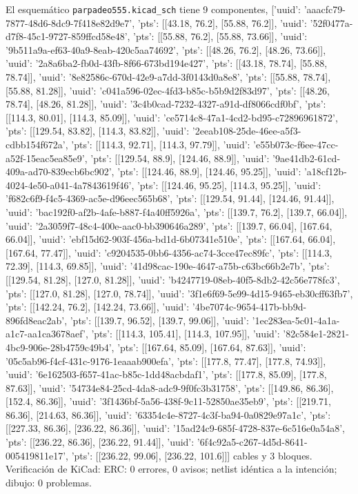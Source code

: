 \documentclass[a4paper,11pt]{article}
\begin{document}
El esquemático \texttt{parpadeo555.kicad\_sch} tiene 9 componentes, [{'uuid': 'aaacfc79-7877-48d6-8dc9-7f418e82d9e7', 'pts': [[43.18, 76.2], [55.88, 76.2]]}, {'uuid': '52f0477a-d7f8-45c1-9727-859ffcd58e48', 'pts': [[55.88, 76.2], [55.88, 73.66]]}, {'uuid': '9b511a9a-ef63-40a9-8eab-420c5aa74692', 'pts': [[48.26, 76.2], [48.26, 73.66]]}, {'uuid': '2a8a6ba2-fb0d-43fb-8f66-673bd194e427', 'pts': [[43.18, 78.74], [55.88, 78.74]]}, {'uuid': '8e82586c-670d-42e9-a7dd-3f0143d0a8e8', 'pts': [[55.88, 78.74], [55.88, 81.28]]}, {'uuid': 'c041a596-02ec-4fd3-b85c-b5b9d2f83d97', 'pts': [[48.26, 78.74], [48.26, 81.28]]}, {'uuid': '3c4b0cad-7232-4327-a91d-df8066cdf0bf', 'pts': [[114.3, 80.01], [114.3, 85.09]]}, {'uuid': 'ce5714c8-47a1-4cd2-bd95-c72896961872', 'pts': [[129.54, 83.82], [114.3, 83.82]]}, {'uuid': '2eeab108-25de-46ee-a5f3-cdbb154f672a', 'pts': [[114.3, 92.71], [114.3, 97.79]]}, {'uuid': 'e55b073c-f6ee-47cc-a52f-15eac5ea85e9', 'pts': [[129.54, 88.9], [124.46, 88.9]]}, {'uuid': '9ae41db2-61cd-409a-ad70-839ecb6bc902', 'pts': [[124.46, 88.9], [124.46, 95.25]]}, {'uuid': 'a18cf12b-4024-4e50-a041-4a7843619f46', 'pts': [[124.46, 95.25], [114.3, 95.25]]}, {'uuid': 'f682c6f9-f4c5-4369-ac5e-d96eec565b68', 'pts': [[129.54, 91.44], [124.46, 91.44]]}, {'uuid': 'bac192f0-af2b-4afe-b887-f4a40ff5926a', 'pts': [[139.7, 76.2], [139.7, 66.04]]}, {'uuid': '2a3059f7-48c4-400e-aac0-bb390646a289', 'pts': [[139.7, 66.04], [167.64, 66.04]]}, {'uuid': 'ebf15d62-903f-456a-bd1d-6b07341e510e', 'pts': [[167.64, 66.04], [167.64, 77.47]]}, {'uuid': 'c9204535-0bb6-4356-ac74-3cce47ec89fc', 'pts': [[114.3, 72.39], [114.3, 69.85]]}, {'uuid': '41d98cac-190e-4647-a75b-c63bc66b2e7b', 'pts': [[129.54, 81.28], [127.0, 81.28]]}, {'uuid': 'b4247719-08eb-40f5-8db2-42c56e778fc3', 'pts': [[127.0, 81.28], [127.0, 78.74]]}, {'uuid': '3f1e6f69-5e99-4d15-9465-eb30cff63fb7', 'pts': [[142.24, 76.2], [142.24, 73.66]]}, {'uuid': '4be7074c-9654-417b-bb9d-896fd8eac2ab', 'pts': [[139.7, 96.52], [139.7, 99.06]]}, {'uuid': '1ec283ea-5c01-4a1a-a1c7-aa1ca3678aef', 'pts': [[114.3, 105.41], [114.3, 107.95]]}, {'uuid': '82c584e1-2821-4bc9-906e-28b4759c49b4', 'pts': [[167.64, 85.09], [167.64, 87.63]]}, {'uuid': '05c5ab96-f4cf-431c-9176-1eaaab900efa', 'pts': [[177.8, 77.47], [177.8, 74.93]]}, {'uuid': '6e162503-f657-41ac-b85c-1dd48acbdaf1', 'pts': [[177.8, 85.09], [177.8, 87.63]]}, {'uuid': '54734e84-25cd-4da8-adc9-9f0fc3b31758', 'pts': [[149.86, 86.36], [152.4, 86.36]]}, {'uuid': '3f1436bf-5a56-438f-9c11-52850ae35eb9', 'pts': [[219.71, 86.36], [214.63, 86.36]]}, {'uuid': '63354c4e-8727-4c3f-ba94-0a0829e97a1c', 'pts': [[227.33, 86.36], [236.22, 86.36]]}, {'uuid': '15ad24c9-685f-4728-837e-6c516e0a54a8', 'pts': [[236.22, 86.36], [236.22, 91.44]]}, {'uuid': '6f4c92a5-c267-4d5d-8641-005419811e17', 'pts': [[236.22, 99.06], [236.22, 101.6]]}] cables y 3 bloques. Verificación de KiCad: ERC: 0 errores, 0 avisos; netlist idéntica a la intención; dibujo: 0 problemas.
\end{document}
